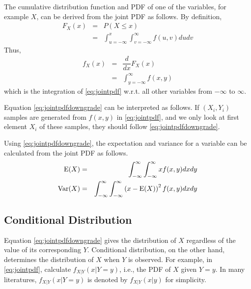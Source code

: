 The cumulative distribution function and PDF of one of the variables, for example $X$, can be derived from the joint PDF as follows. By definition, 
\begin{eqnarray}
	F_X(x) &=& P(X \leq x) \nonumber \\
	&=& \int_{u=-\infty}^{x}\int_{v=-\infty}^{\infty}f(u, v)dudv \nonumber
\end{eqnarray}
Thus,
\begin{eqnarray}
	f_X(x) &=& \dfrac{d}{dx}F_X(x) \nonumber \\
	&=& \int_{y=-\infty}^{\infty} f(x, y) \label{eq:jointpdfdowngrade}
\end{eqnarray}
which is the integration of \eqref{eq:jointpdf} w.r.t. all other variables from $-\infty$ to $\infty$. 

Equation \eqref{eq:jointpdfdowngrade} can be interpreted as follows. If $(X_i, Y_i)$ samples are generated from $f(x, y)$ in \eqref{eq:jointpdf}, and we only look at first element $X_i$ of these samples, they should follow \eqref{eq:jointpdfdowngrade}.

Using \eqref{eq:jointpdfdowngrade}, the expectation and variance for a variable can be calculated from the joint PDF as follows.
\begin{eqnarray}
	\textup{E}(X) &=& \int_{-\infty}^{\infty}\int_{-\infty}^{\infty}xf(x, y)dxdy \nonumber \\
	\textup{Var}(X) &=& \int_{-\infty}^{\infty}\int_{-\infty}^{\infty}\left(x-\textup{E}(X)\right)^2f(x, y)dxdy \nonumber
\end{eqnarray}

\subsection{Conditional Distribution}

Equation \eqref{eq:jointpdfdowngrade} gives the distribution of $X$ regardless of the value of its corresponding $Y$. Conditional distribution, on the other hand, determines the distribution of $X$ when $Y$ is observed. For example, in \eqref{eq:jointpdf}, calculate $f_{X|Y}(x |Y=y)$, i.e., the PDF of $X$ given $Y=y$. In many literatures, $f_{X|Y}(x |Y=y)$ is denoted by $f_{X|Y}(x|y)$ for simplicity.

